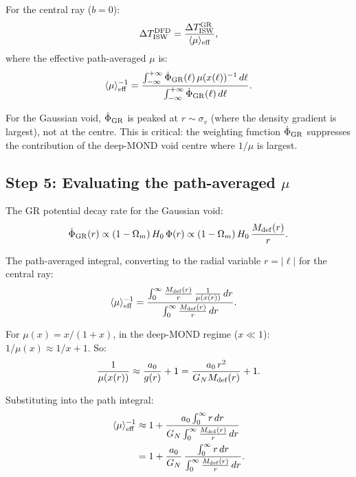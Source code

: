 \documentclass[11pt]{article}
\newcommand{\GN}{G_N}
\newcommand{\aM}{a_0}
\newcommand{\Hzero}{H_0}
\newcommand{\mufd}{\mu}
\begin{document}
For the central ray ($b = 0$):
\begin{equation}
\Delta T_{\rm ISW}^{\rm DFD}
= \frac{\Delta T_{\rm ISW}^{\rm GR}}{\langle\mufd\rangle_{\rm eff}},
\label{eq:ISW-ratio}
\end{equation}
where the effective path-averaged $\mufd$ is:
\begin{equation}
\langle\mufd\rangle_{\rm eff}^{-1}
= \frac{\int_{-\infty}^{+\infty}\dot{\Phi}_{\rm GR}(\ell)\,
\mufd(x(\ell))^{-1}\,d\ell}
{\int_{-\infty}^{+\infty}\dot{\Phi}_{\rm GR}(\ell)\,d\ell}.
\label{eq:mu-eff}
\end{equation}

For the Gaussian void, $\dot{\Phi}_{\rm GR}$ is peaked at
$r \sim \sigma_v$ (where the density gradient is largest), not at the
centre. This is critical: the weighting function $\dot{\Phi}_{\rm GR}$
suppresses the contribution of the deep-MOND void centre where
$1/\mufd$ is largest.

\subsection{Step 5: Evaluating the path-averaged $\mufd$}

The GR potential decay rate for the Gaussian void:
\begin{equation}
\dot{\Phi}_{\rm GR}(r)
\propto (1 - \Omega_m)\,\Hzero\,\Phi(r)
\propto (1 - \Omega_m)\,\Hzero\,\frac{M_{\rm def}(r)}{r}.
\label{eq:Phi-dot-profile}
\end{equation}

The path-averaged integral, converting to the radial variable
$r = |\ell|$ for the central ray:
\begin{align}
\langle\mufd\rangle_{\rm eff}^{-1}
&= \frac{\int_0^{\infty}\frac{M_{\rm def}(r)}{r}\,
\frac{1}{\mufd(x(r))}\,dr}
{\int_0^{\infty}\frac{M_{\rm def}(r)}{r}\,dr}.
\label{eq:mu-eff-radial}
\end{align}

For $\mufd(x) = x/(1+x)$, in the deep-MOND regime ($x \ll 1$):
$1/\mufd(x) \approx 1/x + 1$. So:
\begin{equation}
\frac{1}{\mufd(x(r))} \approx \frac{\aM}{g(r)} + 1
= \frac{\aM\,r^2}{\GN M_{\rm def}(r)} + 1.
\label{eq:mu-inv-deep}
\end{equation}

Substituting into the path integral:
\begin{align}
\langle\mufd\rangle_{\rm eff}^{-1}
&\approx 1 + \frac{\aM\int_0^{\infty}r\,dr}
{\GN\int_0^{\infty}\frac{M_{\rm def}(r)}{r}\,dr}
\nonumber\\
&= 1 + \frac{\aM}{\GN}\,
\frac{\int_0^{\infty}r\,dr}
{\int_0^{\infty}\frac{M_{\rm def}(r)}{r}\,dr}.
\label{eq:mu-eff-expand}
\end{align}
\end{document}
